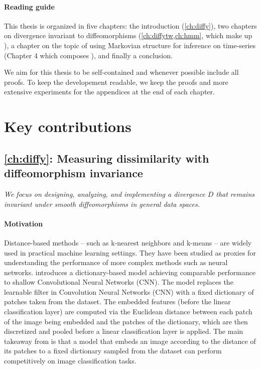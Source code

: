 \paragraph{Reading guide}

This thesis is organized in five chapters: the introduction (\cref{ch:diffy}), two chapters on divergence invariant to diffeomorphisms (\cref{ch:diffytw,ch:hmm}, which make up ), a chapter on the topic of using Markovian structure for inference on time-series (Chapter 4 which composes ), and finally a conclusion.

We aim for this thesis to be self-contained and whenever possible include all proofs. To keep the developement readable, we keep the proofs and more extensive experiments for the appendices at the end of each chapter.

\pagebreak
\section{Key contributions}



\subsection*{\cref{ch:diffy}: Measuring dissimilarity with diffeomorphism invariance}

\emph{We focus on designing, analyzing, and implementing a divergence $D$ that remains invariant under smooth diffeomorphisms in general data spaces.}


\paragraph{Motivation}
Distance-based methods -- such as k-nearest neighbors and k-means -- are widely used in practical machine learning settings. They have been studied as proxies for understanding the performance of more complex methods such as neural networks. \cite{thiry} introduces a dictionary-based model achieving comparable performance to shallow Convolutional Neural Networks (CNN). The model replaces the learnable filter in Convolution Neural Networks (CNN) with a fixed dictionary of patches taken from the dataset. The embedded features (before the linear classification layer) are computed via the Euclidean distance between each patch of the image being embedded and the patches of the dictionary, which are then discretized and pooled before a linear classification layer is applied. The main takeaway from \cite{thiry} is that a model that embeds an image according to the distance of its patches to a fixed dictionary sampled from the dataset can perform competitively on image classification tasks.


